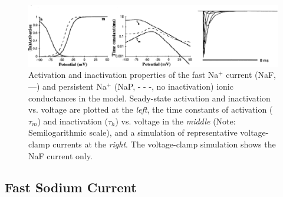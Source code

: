 \documentclass[12pt]{article}
\begin{document}
\begin{figure}[h]
\centering
   \includegraphics[scale=0.75]{figures/DS1.2A.eps}
   \caption{Activation and inactivation properties of the fast Na$^+$ current (NaF, ---) and persistent Na$^+$ (NaP, - - -, no inactivation) ionic conductances in the model. Seady-state activation and inactivation vs. voltage are plotted at the {\em left}, the time constants of activation ($\tau_m$) and inactivation ($\tau_h$) vs. voltage in the {\em middle} (Note: Semilogarithmic scale), and a simulation of representative voltage-clamp currents at the {\em right}. The voltage-clamp simulation shows the NaF current only.}
   \label{fig:DS1.2A}
\end{figure}

\subsection*{Fast Sodium Current}
\end{document}

